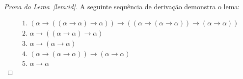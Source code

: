         \begin{proof}[Prova do Lema~\ref{lem:id}]
            A seguinte sequência de derivação demonstra o lema:
            
            \begin{align*}
                & \text{1. } (\alpha \to ((\alpha \to \alpha) \to \alpha)) \to ((\alpha \to (\alpha \to \alpha)) \to (\alpha \to \alpha))\tag{Ax2}\\
                & \text{2. } \alpha \to ((\alpha \to \alpha) \to \alpha)\tag{Ax1}\\
                & \text{3. } \alpha \to (\alpha \to \alpha)\tag{Ax1}\\
                & \text{4. } (\alpha \to (\alpha \to \alpha)) \to (\alpha \to \alpha)\tag{MP 1,2}\\
                & \text{5. } \alpha \to \alpha\tag{MP 3,4}
            \end{align*}
        \end{proof}

